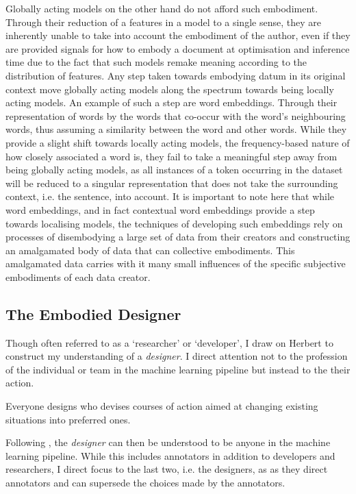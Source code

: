 Globally acting models on the other hand do not afford such embodiment.
Through their reduction of a features in a model to a single sense, they are inherently unable to take into account the embodiment of the author, even if they are provided signals for how to embody a document at optimisation and inference time due to the fact that such models remake meaning according to the distribution of features.
Any step taken towards embodying datum in its original context move globally acting models along the spectrum towards being locally acting models.
An example of such a step are word embeddings.
Through their representation of words by the words that co-occur with the word's neighbouring words, thus assuming a similarity between the word and other words.
While they provide a slight shift towards locally acting models, the frequency-based nature of how closely associated a word is, they fail to take a meaningful step away from being globally acting models, as all instances of a token occurring in the dataset will be reduced to a singular representation that does not take the surrounding context, i.e. the sentence, into account.
It is important to note here that while word embeddings, and in fact contextual word embeddings provide a step towards localising models, the techniques of developing such embeddings rely on processes of disembodying a large set of data from their creators and constructing an amalgamated body of data that can collective embodiments.
This amalgamated data carries with it many small influences of the specific subjective embodiments of each data creator.

\subsection{The Embodied Designer}
Though often referred to as a `researcher' or `developer', I draw on Herbert \citet{Simon:1969} to construct my understanding of a \textit{designer}.
I direct attention not to the profession of the individual or team in the machine learning pipeline but instead to the their action.

\begin{citequote}{\citep[p. 111]{Simon:1969}}
  Everyone designs who devises courses of action aimed at changing existing situations into preferred ones.
\end{citequote}

Following \citet{Simon:1969}, the \textit{designer} can then be understood to be anyone in the machine learning pipeline.
While this includes annotators in addition to developers and researchers, I direct focus to the last two, i.e. the designers, as as they direct annotators and can supersede the choices made by the annotators.


